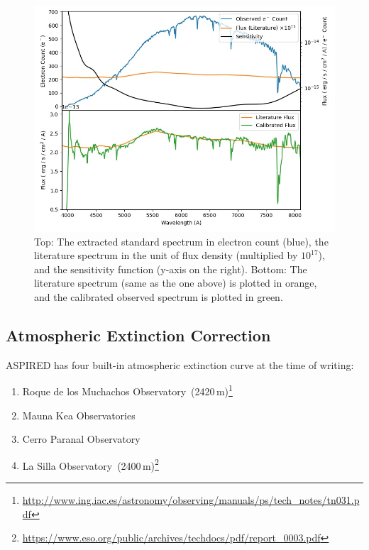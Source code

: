 \documentclass[fleqn,usenatbib]{mnras}
\begin{document}
\begin{figure}
    \centering
    \includegraphics[width=\columnwidth]{fig_06_flux_calibration_diagnostics.jpg}
    \caption{Top: The extracted standard spectrum in electron count
    (blue), the literature spectrum in the unit of flux density (multiplied
    by $10^{17}$), and the sensitivity function (y-axis on the right).
    Bottom: The literature spectrum (same as the one above) is plotted
    in orange, and the calibrated observed spectrum is plotted in green.}
    \label{fig:wavecal}
\end{figure}

\subsection{Atmospheric Extinction Correction}
\textsc{ASPIRED} has four built-in atmospheric extinction curve at the time
of writing:

\begin{enumerate}
    \item Roque de los Muchachos Observatory~(2420\,m)\footnote{\url{http://www.ing.iac.es/astronomy/observing/manuals/ps/tech\_notes/tn031.pdf}}
    \item Mauna Kea Observatories~\citep[4205\,m;][]{2013A&A...549A...8B}
    \item Cerro Paranal Observatory~\citep[2635\,m;][]{2011A&A...527A..91P}
    \item La Silla Observatory~(2400\,m)\footnote{\url{https://www.eso.org/public/archives/techdocs/pdf/report\_0003.pdf}}
\end{enumerate}
\end{document}
